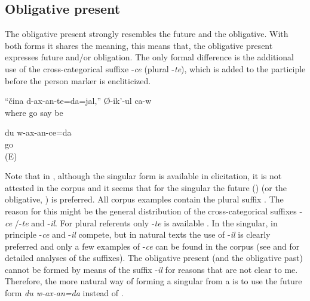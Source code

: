 \subsection{Obligative present}
\label{ssec:Obligative present}

The obligative present strongly resembles the future and the obligative. With both forms it shares the meaning, this means that, the obligative present expresses future and/or obligation. The only formal difference is the additional use of the cross-categorical suffixe -\textit{ce} (plural -\textit{te}), which is added to the participle before the person marker is encliticized.
%
\begin{exe}
	\ex	\label{ex:‎Where will you (pl) go he says}
	\gll	``čina	d-ax-an-te=da=jal,''	Ø-ik'-ul	ca-w	\\
		where	go	say	be	\\
	\glt	{}

	\ex	\label{ex:I will go / have to go analytic}
	\gll	du	w-ax-an-ce=da\\
			go\\
	\glt	{} (E)
\end{exe}

Note that in , although the singular form  is available in elicitation, it is not attested in the corpus and it seems that for the singular the future () (or the obligative, ) is preferred. All corpus examples contain the plural suffix . The reason for this might be the general distribution of the cross-categorical suffixes -\textit{ce} /-\textit{te} and -\textit{il}. For plural referents only -\textit{te} is available . In the singular, in principle -\textit{ce} and -\textit{il} compete, but in natural texts the use of -\textit{il} is clearly preferred and only a few examples of -\textit{ce} can be found in the corpus (see  and  for detailed analyses of the suffixes). The obligative present (and the obligative past) cannot be formed by means of the suffix -\textit{il} for reasons that are not clear to me. Therefore, the more natural way of forming a singular from a   is to use the future form \textit{du w-ax-an=da} instead of .

